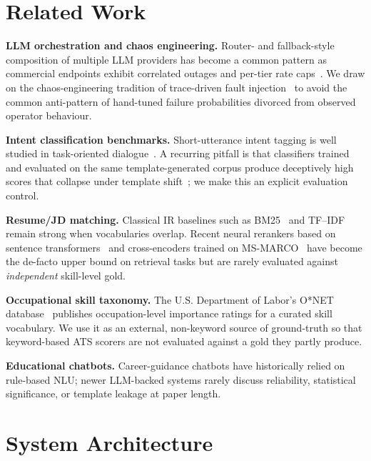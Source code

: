 \documentclass[conference]{IEEEtran}
\begin{document}
\section{Related Work}\label{sec:related}

\textbf{LLM orchestration and chaos engineering.}
Router- and fallback-style composition of multiple LLM providers has
become a common pattern as commercial endpoints exhibit correlated
outages and per-tier rate caps~\cite{ribeiro2023llmrouter}. We draw on
the chaos-engineering tradition of trace-driven fault
injection~\cite{basiri2016chaos} to avoid the common anti-pattern of
hand-tuned failure probabilities divorced from observed operator
behaviour.

\noindent\textbf{Intent classification benchmarks.}
Short-utterance intent tagging is well studied in task-oriented
dialogue~\cite{casanueva2020banking77,larson2019clinc}. A recurring
pitfall is that classifiers trained and evaluated on the same
template-generated corpus produce deceptively high scores that collapse
under template shift~\cite{larson2019clinc}; we make this an explicit
evaluation control.

\noindent\textbf{Resume/JD matching.}
Classical IR baselines such as BM25~\cite{robertson2009probabilistic}
and TF--IDF remain strong when vocabularies overlap. Recent neural
rerankers based on sentence
transformers~\cite{reimers2019sentence} and cross-encoders trained on
MS-MARCO~\cite{nogueira2019passage} have become the de-facto upper
bound on retrieval tasks but are rarely evaluated against
\emph{independent} skill-level gold.

\noindent\textbf{Occupational skill taxonomy.}
The U.S. Department of Labor's O*NET database~\cite{onet282} publishes
occupation-level importance ratings for a curated skill vocabulary. We
use it as an external, non-keyword source of ground-truth so that
keyword-based ATS scorers are not evaluated against a gold they partly
produce.

\noindent\textbf{Educational chatbots.}
Career-guidance chatbots have historically relied on rule-based NLU;
newer LLM-backed systems rarely discuss reliability, statistical
significance, or template leakage at paper length.

\section{System Architecture}\label{sec:arch}
\end{document}
